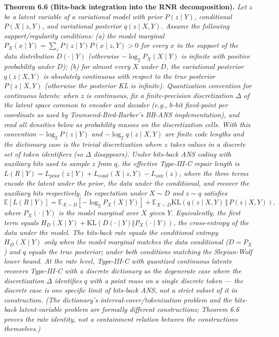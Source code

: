 \documentclass[
]{article}
\begin{document}
\textbf{Theorem 6.6 (Bits-back integration into the RNR
decomposition).} \emph{Let $z$ be a latent variable of a variational
model with prior $P(z \mid Y)$, conditional $P(X \mid z, Y)$, and
variational posterior $q(z \mid X, Y)$. Assume the following
support/regularity conditions: (a) the model marginal
$P_X(x \mid Y) = \sum_z P(z \mid Y) P(x \mid z, Y) > 0$ for every
$x$ in the support of the data distribution $D(\cdot \mid Y)$
(otherwise $-\log_2 P_X(X \mid Y)$ is infinite with positive
probability under $D$); (b) for almost every $X$ under $D$, the
variational posterior $q(z \mid X, Y)$ is absolutely continuous
with respect to the true posterior $P(z \mid X, Y)$ (otherwise the
posterior KL is infinite). \emph{Quantization convention for
continuous latents:} when $z$ is continuous, fix a finite-precision
discretization $\Delta$ of the latent space common to encoder and
decoder (e.g., $b$-bit fixed-point per coordinate as used by
Townsend-Bird-Barber's BB-ANS implementation), and read all
densities below as probability masses on the discretization cells.
With this convention $-\log_2 P(z \mid Y)$ and $-\log_2 q(z \mid X,
Y)$ are finite code lengths and the dictionary case is the trivial
discretization where $z$ takes values in a discrete set of token
identifiers (so $\Delta$ disappears). Under
bits-back ANS coding with auxiliary bits used to sample $z$ from $q$,
the effective Type-III-C repair length is
$L(R \mid Y) = L_{\text{prior}}(z \mid Y) + L_{\text{cond}}(X \mid z, Y) - L_{\text{aux}}(z)$,
where the three terms encode the latent under the prior, the data
under the conditional, and recover the auxiliary bits respectively.
Its expectation under $X \sim D$ and $z \sim q$ satisfies}
\[
\mathbb{E}[L(R \mid Y)] = \mathbb{E}_{X \sim D}[-\log_2 P_X(X \mid Y)]
+ \mathbb{E}_{X \sim D} \mathrm{KL}\!\left(q(z \mid X, Y) \,\Vert\, P(z \mid X, Y)\right),
\tag{6.4}
\]
\emph{where $P_X(\cdot \mid Y)$ is the model marginal over $X$ given
$Y$. Equivalently, the first term equals
$H_D(X \mid Y) + \mathrm{KL}(D(\cdot \mid Y) \Vert P_X(\cdot \mid Y))$,
the cross-entropy of the data under the model. The bits-back rate
equals the conditional entropy $H_D(X \mid Y)$ only when the model
marginal matches the data conditional ($D = P_X$) and $q$ equals the
true posterior; under both conditions matching the Slepian-Wolf lower
bound. At the rate level, Type-III-C with quantized continuous
latents recovers Type-III-C with a discrete dictionary as the
degenerate case where the discretization $\Delta$ identifies $q$
with a point mass on a single discrete token --- the discrete case
is one specific limit of bits-back ANS, not a strict subset of it
in construction. (The dictionary's interval-cover/tokenization
problem and the bits-back latent-variable problem are formally
different constructions; Theorem 6.6 proves the rate identity, not
a containment relation between the constructions themselves.)}
\end{document}
